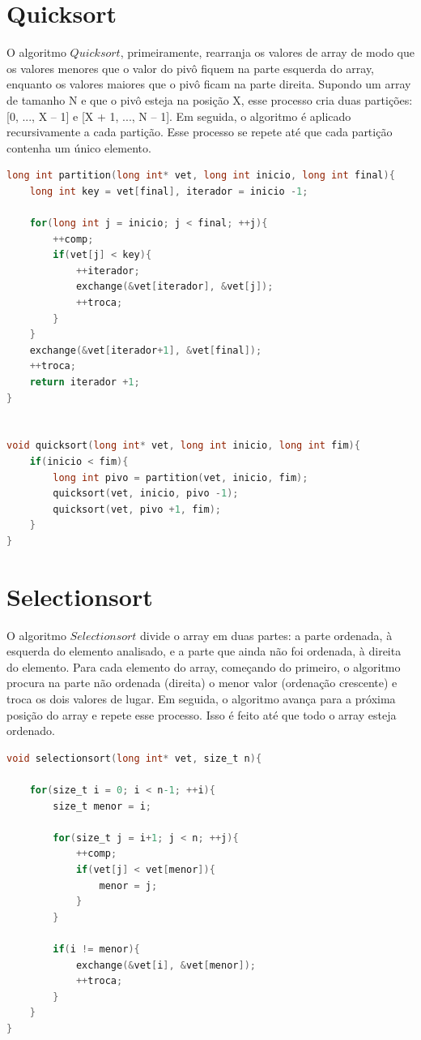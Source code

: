 \documentclass[report]{uftex}
\begin{document}
\section{Quicksort}
O algoritmo $Quicksort$, primeiramente, rearranja os valores de array de modo que os valores menores que o valor do pivô fiquem na parte esquerda do array, enquanto os valores maiores que o pivô ficam na parte direita. Supondo um array de tamanho N e que o pivô esteja na posição X, esse processo cria duas partições: [0, ..., X – 1] e [X + 1, ..., N – 1]. Em seguida, o algoritmo é aplicado recursivamente a cada partição. Esse processo se repete até que cada partição contenha um único elemento.\\

\begin{lstlisting}[language=C]
long int partition(long int* vet, long int inicio, long int final){
    long int key = vet[final], iterador = inicio -1;

    for(long int j = inicio; j < final; ++j){
        ++comp;
        if(vet[j] < key){
            ++iterador;
            exchange(&vet[iterador], &vet[j]);
            ++troca;
        }
    }
    exchange(&vet[iterador+1], &vet[final]);
    ++troca;
    return iterador +1;
}


void quicksort(long int* vet, long int inicio, long int fim){
    if(inicio < fim){
        long int pivo = partition(vet, inicio, fim);
        quicksort(vet, inicio, pivo -1);
        quicksort(vet, pivo +1, fim);
    }
}
\end{lstlisting}


\section{Selectionsort}
O algoritmo $Selectionsort$ divide o array em duas partes: a parte ordenada, à esquerda do elemento analisado, e a parte que ainda não foi ordenada, à direita do elemento. Para cada elemento do array, começando do primeiro, o algoritmo procura na parte não ordenada (direita) o menor valor (ordenação crescente) e troca os dois valores de lugar. Em seguida, o algoritmo avança para a próxima posição do array e repete esse processo. Isso é feito até que todo o array esteja ordenado.\\

\begin{lstlisting}[language=C]
void selectionsort(long int* vet, size_t n){
    
    for(size_t i = 0; i < n-1; ++i){
        size_t menor = i;

        for(size_t j = i+1; j < n; ++j){
            ++comp;
            if(vet[j] < vet[menor]){
                menor = j;
            }
        }

        if(i != menor){
            exchange(&vet[i], &vet[menor]);
            ++troca;
        }
    }   
}
\end{lstlisting}
\end{document}
